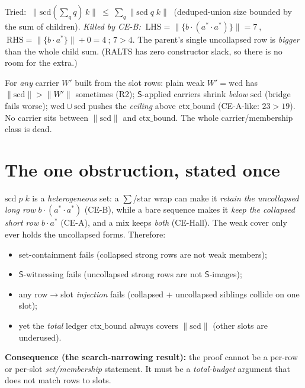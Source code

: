 \documentclass{article}
\newcommand{\rss}[1]{\lVert #1\rVert}                %
\newcommand{\sd}{\mathrm{scd}}                       %
\newcommand{\wcd}{\mathrm{wcd}}                        %
\newcommand{\ctxb}{\mathrm{ctx\_bound}}
\newcommand{\Strong}{\mathsf{S}}                     %
\newcommand{\seq}{\cdot}
\begin{document}
\begin{description}[leftmargin=0pt,itemsep=5pt]
\item[\textbf{R5. Pure numeric induction, RALTS step.}]
Tried: $\ \rss{\sd(\sum_q q)\,k}\ \le\ \sum_q \rss{\sd\;q\;k}\ $ (deduped-union size bounded by the sum of children).
\emph{Killed by CE-B:} $\ \mathrm{LHS}=\rss{\{b\seq(a^{*}\seq a^{*})\}}=7\ $, $\ \mathrm{RHS}=\rss{\{b\seq a^{*}\}}+0=4\ $;
$7>4$. The parent's single uncollapsed row is \emph{bigger} than the whole child sum. (RALTS has zero
constructor slack, so there is no room for the extra.)

\item[\textbf{R6. Any slot-derived carrier (the impossibility square).}]
For \emph{any} carrier $W'$ built from the slot rows: plain weak $W'=\wcd$ has $\rss{\sd}>\rss{W'}$ sometimes (R2);
$\Strong$-applied carriers shrink \emph{below} $\sd$ (bridge fails worse); $\wcd\cup\sd$ pushes the \emph{ceiling}
above $\ctxb$ (CE-A-like: $23>19$). No carrier sits between $\rss{\sd}$ and $\ctxb$. The whole
carrier/membership class is dead.
\end{description}

\section{The one obstruction, stated once}
$\sd\;p\;k$ is a \emph{heterogeneous} set: a $\sum$/star wrap can make it \emph{retain the uncollapsed long
row} $b\seq(a^{*}\seq a^{*})$ (CE-B), while a bare sequence makes it \emph{keep the collapsed short row}
$b\seq a^{*}$ (CE-A), and a mix keeps \emph{both} (CE-Hall). The weak cover only ever holds the uncollapsed
forms. Therefore:
\begin{itemize}[itemsep=1pt]
\item set-containment fails (collapsed strong rows are not weak members);
\item $\Strong$-witnessing fails (uncollapsed strong rows are not $\Strong$-images);
\item any row$\to$slot \emph{injection} fails (collapsed + uncollapsed siblings collide on one slot);
\item yet the \emph{total} ledger $\ctxb$ always covers $\rss{\sd}$ (other slots are underused).
\end{itemize}
\textbf{Consequence (the search-narrowing result):} the proof cannot be a per-row or per-slot
\emph{set/membership} statement. It must be a \emph{total-budget} argument that does not match rows to slots.
\end{document}
